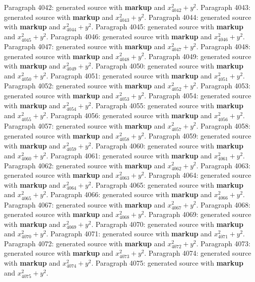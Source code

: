 \documentclass{article}
\begin{document}
Paragraph 4042: generated source with \textbf{markup} and $x_{4042}^2 + y^2$.
Paragraph 4043: generated source with \textbf{markup} and $x_{4043}^2 + y^2$.
Paragraph 4044: generated source with \textbf{markup} and $x_{4044}^2 + y^2$.
Paragraph 4045: generated source with \textbf{markup} and $x_{4045}^2 + y^2$.
Paragraph 4046: generated source with \textbf{markup} and $x_{4046}^2 + y^2$.
Paragraph 4047: generated source with \textbf{markup} and $x_{4047}^2 + y^2$.
Paragraph 4048: generated source with \textbf{markup} and $x_{4048}^2 + y^2$.
Paragraph 4049: generated source with \textbf{markup} and $x_{4049}^2 + y^2$.
Paragraph 4050: generated source with \textbf{markup} and $x_{4050}^2 + y^2$.
Paragraph 4051: generated source with \textbf{markup} and $x_{4051}^2 + y^2$.
Paragraph 4052: generated source with \textbf{markup} and $x_{4052}^2 + y^2$.
Paragraph 4053: generated source with \textbf{markup} and $x_{4053}^2 + y^2$.
Paragraph 4054: generated source with \textbf{markup} and $x_{4054}^2 + y^2$.
Paragraph 4055: generated source with \textbf{markup} and $x_{4055}^2 + y^2$.
Paragraph 4056: generated source with \textbf{markup} and $x_{4056}^2 + y^2$.
Paragraph 4057: generated source with \textbf{markup} and $x_{4057}^2 + y^2$.
Paragraph 4058: generated source with \textbf{markup} and $x_{4058}^2 + y^2$.
Paragraph 4059: generated source with \textbf{markup} and $x_{4059}^2 + y^2$.
Paragraph 4060: generated source with \textbf{markup} and $x_{4060}^2 + y^2$.
Paragraph 4061: generated source with \textbf{markup} and $x_{4061}^2 + y^2$.
Paragraph 4062: generated source with \textbf{markup} and $x_{4062}^2 + y^2$.
Paragraph 4063: generated source with \textbf{markup} and $x_{4063}^2 + y^2$.
Paragraph 4064: generated source with \textbf{markup} and $x_{4064}^2 + y^2$.
Paragraph 4065: generated source with \textbf{markup} and $x_{4065}^2 + y^2$.
Paragraph 4066: generated source with \textbf{markup} and $x_{4066}^2 + y^2$.
Paragraph 4067: generated source with \textbf{markup} and $x_{4067}^2 + y^2$.
Paragraph 4068: generated source with \textbf{markup} and $x_{4068}^2 + y^2$.
Paragraph 4069: generated source with \textbf{markup} and $x_{4069}^2 + y^2$.
Paragraph 4070: generated source with \textbf{markup} and $x_{4070}^2 + y^2$.
Paragraph 4071: generated source with \textbf{markup} and $x_{4071}^2 + y^2$.
Paragraph 4072: generated source with \textbf{markup} and $x_{4072}^2 + y^2$.
Paragraph 4073: generated source with \textbf{markup} and $x_{4073}^2 + y^2$.
Paragraph 4074: generated source with \textbf{markup} and $x_{4074}^2 + y^2$.
Paragraph 4075: generated source with \textbf{markup} and $x_{4075}^2 + y^2$.
\end{document}
